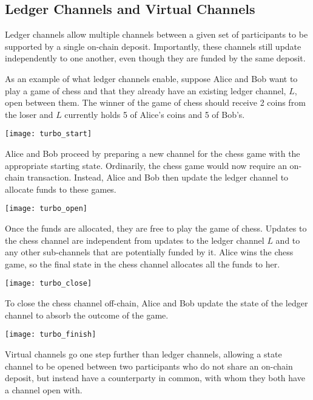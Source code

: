 \documentclass{article}
\begin{document}
\subsection{Ledger Channels and Virtual Channels}

Ledger channels allow multiple channels between a given set of participants to be supported by a single on-chain deposit.
Importantly, these channels still update independently to one another, even though they are funded by the same deposit.

As an example of what ledger channels enable, suppose Alice and Bob want to play a game of chess and that
they already have an existing ledger channel, $L$, open between them.
The winner of the game of chess should receive 2 coins from the loser and $L$ currently holds
5 of Alice's coins and 5 of Bob's.

\begin{center}
  \texttt{[image: turbo\_start]} %
\end{center}

Alice and Bob proceed by preparing a new channel for the chess game with the appropriate starting state.
Ordinarily, the chess game would now require an on-chain transaction.
Instead, Alice and Bob then update the ledger channel to allocate funds to these games.

\begin{center}
  \texttt{[image: turbo\_open]} %
\end{center}

Once the funds are allocated, they are free to play the game of chess.
Updates to the chess channel are independent from updates to the ledger channel $L$ and to
any other sub-channels that are potentially funded by it. 
Alice wins the chess game, so the final state in the chess channel allocates all the
funds to her.

\begin{center}
  \texttt{[image: turbo\_close]} %
\end{center}

To close the chess channel off-chain, Alice and Bob update the state of the ledger channel to absorb the outcome of the game.

\begin{center}
  \texttt{[image: turbo\_finish]} %
\end{center}

Virtual channels go one step further than ledger channels, allowing a state channel to be opened between two participants who do not share an on-chain deposit, but instead have a counterparty in common, with whom they both have a channel open with.
\end{document}
